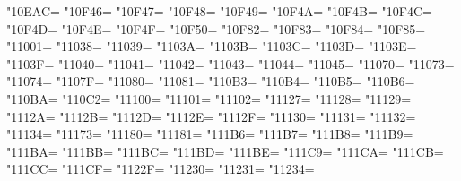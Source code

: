 \XeTeXcharclass"10EAC=\KclassNum
\XeTeXcharclass"10F46=\KclassNum
\XeTeXcharclass"10F47=\KclassNum
\XeTeXcharclass"10F48=\KclassNum
\XeTeXcharclass"10F49=\KclassNum
\XeTeXcharclass"10F4A=\KclassNum
\XeTeXcharclass"10F4B=\KclassNum
\XeTeXcharclass"10F4C=\KclassNum
\XeTeXcharclass"10F4D=\KclassNum
\XeTeXcharclass"10F4E=\KclassNum
\XeTeXcharclass"10F4F=\KclassNum
\XeTeXcharclass"10F50=\KclassNum
\XeTeXcharclass"10F82=\KclassNum
\XeTeXcharclass"10F83=\KclassNum
\XeTeXcharclass"10F84=\KclassNum
\XeTeXcharclass"10F85=\KclassNum
\XeTeXcharclass"11001=\KclassNum
\XeTeXcharclass"11038=\KclassNum
\XeTeXcharclass"11039=\KclassNum
\XeTeXcharclass"1103A=\KclassNum
\XeTeXcharclass"1103B=\KclassNum
\XeTeXcharclass"1103C=\KclassNum
\XeTeXcharclass"1103D=\KclassNum
\XeTeXcharclass"1103E=\KclassNum
\XeTeXcharclass"1103F=\KclassNum
\XeTeXcharclass"11040=\KclassNum
\XeTeXcharclass"11041=\KclassNum
\XeTeXcharclass"11042=\KclassNum
\XeTeXcharclass"11043=\KclassNum
\XeTeXcharclass"11044=\KclassNum
\XeTeXcharclass"11045=\KclassNum
\XeTeXcharclass"11070=\KclassNum
\XeTeXcharclass"11073=\KclassNum
\XeTeXcharclass"11074=\KclassNum
\XeTeXcharclass"1107F=\KclassNum
\XeTeXcharclass"11080=\KclassNum
\XeTeXcharclass"11081=\KclassNum
\XeTeXcharclass"110B3=\KclassNum
\XeTeXcharclass"110B4=\KclassNum
\XeTeXcharclass"110B5=\KclassNum
\XeTeXcharclass"110B6=\KclassNum
\XeTeXcharclass"110BA=\KclassNum
\XeTeXcharclass"110C2=\KclassNum
\XeTeXcharclass"11100=\KclassNum
\XeTeXcharclass"11101=\KclassNum
\XeTeXcharclass"11102=\KclassNum
\XeTeXcharclass"11127=\KclassNum
\XeTeXcharclass"11128=\KclassNum
\XeTeXcharclass"11129=\KclassNum
\XeTeXcharclass"1112A=\KclassNum
\XeTeXcharclass"1112B=\KclassNum
\XeTeXcharclass"1112D=\KclassNum
\XeTeXcharclass"1112E=\KclassNum
\XeTeXcharclass"1112F=\KclassNum
\XeTeXcharclass"11130=\KclassNum
\XeTeXcharclass"11131=\KclassNum
\XeTeXcharclass"11132=\KclassNum
\XeTeXcharclass"11134=\KclassNum
\XeTeXcharclass"11173=\KclassNum
\XeTeXcharclass"11180=\KclassNum
\XeTeXcharclass"11181=\KclassNum
\XeTeXcharclass"111B6=\KclassNum
\XeTeXcharclass"111B7=\KclassNum
\XeTeXcharclass"111B8=\KclassNum
\XeTeXcharclass"111B9=\KclassNum
\XeTeXcharclass"111BA=\KclassNum
\XeTeXcharclass"111BB=\KclassNum
\XeTeXcharclass"111BC=\KclassNum
\XeTeXcharclass"111BD=\KclassNum
\XeTeXcharclass"111BE=\KclassNum
\XeTeXcharclass"111C9=\KclassNum
\XeTeXcharclass"111CA=\KclassNum
\XeTeXcharclass"111CB=\KclassNum
\XeTeXcharclass"111CC=\KclassNum
\XeTeXcharclass"111CF=\KclassNum
\XeTeXcharclass"1122F=\KclassNum
\XeTeXcharclass"11230=\KclassNum
\XeTeXcharclass"11231=\KclassNum
\XeTeXcharclass"11234=\KclassNum
